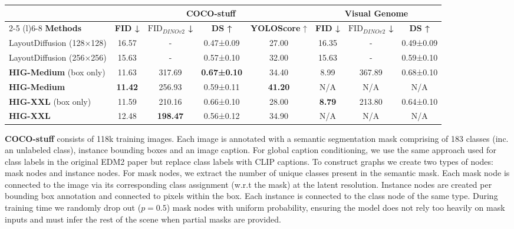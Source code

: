 \begin{table*}[t]
\label{table:metrics}
\centering
\caption{Results comparison between our method with guidance = 1.8 and LayoutDiffusion.}
\vspace{5bp}
\begin{tabular}{@{}lccccccc@{}}
\toprule & \multicolumn{4}{c}{\textbf{COCO-stuff}} & \multicolumn{3}{c}{\textbf{Visual Genome}} \\ 
\cmidrule(l){2-5} 
\cmidrule(l){6-8} 
\textbf{Methods} & \textbf{FID ↓} & \textbf{$\text{FID}_{\textit{DINOv2}}$ ↓} & \textbf{DS ↑} & \textbf{YOLOScore} ↑ & \textbf{FID ↓ }& \textbf{$\text{FID}_{\textit{DINOv2}}$ ↓}& \textbf{DS ↑} \\ \midrule

LayoutDiffusion (128$\times$128) &16.57&-&0.47±0.09&27.00&16.35&-&0.49±0.09\\
LayoutDiffusion (256$\times$256) &15.63&-&0.57±0.10&32.00&15.63&-&0.59±0.10\\
\textbf{HIG-Medium} (box only) & 11.63 &317.69&\textbf{0.67±0.10} &34.40& 8.99 & 367.89 & 0.68±0.10 \\
\textbf{HIG-Medium} & \textbf{11.42} & 256.93&0.59±0.11&\textbf{41.20}& N/A & N/A & N/A \\
\textbf{HIG-XXL} (box only) & 11.59 &  210.16 & 0.66±0.10 & 28.00 &\textbf{8.79}&213.80&0.64±0.10\\
\textbf{HIG-XXL} & 12.48 & \textbf{198.47}&0.56±0.12& 34.90&N/A&N/A& N/A \\
\bottomrule
\end{tabular}
\end{table*}

\textbf{COCO-stuff} consists of 118k training images. Each image is annotated with a semantic segmentation mask comprising of 183 classes (inc. an unlabeled class), instance bounding boxes and an image caption. For global caption conditioning, we use the same approach used for class labels in the original EDM2 paper but replace class labels with CLIP captions.
To construct graphs we create two types of nodes: mask nodes and instance nodes.
For mask nodes, we extract the number of unique classes present in the semantic mask. Each mask node is connected to the image via its corresponding class assignment (w.r.t the mask) at the latent resolution. Instance nodes are created per bounding box annotation and connected to pixels within the box. Each instance is connected to the class node of the same type. During training time we randomly drop out ($p=0.5$) mask nodes with uniform probability, ensuring the model does not rely too heavily on mask inputs and must infer the rest of the scene when partial masks are provided.

